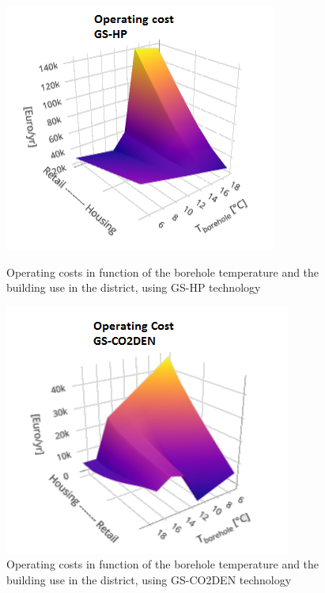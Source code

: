 \documentclass{article}
\begin{document}
\begin{figure}[!htb]
	\centering
	\begin{minipage}{.45\textwidth}
		\centering
		\includegraphics[width=\textwidth]{CUTg_SA_OC.png}
		\caption{Operating costs in function of the borehole temperature and the building use in the district, using GS-HP technology}
		\label{fig:CUTg_OC}
	\end{minipage}%
	\hspace{1cm}
	\begin{minipage}{0.45\textwidth}
		\centering
		\includegraphics[width=\textwidth]{CUTg_SA_CO2_OC.png}
		\caption{Operating costs in function of the borehole temperature and the building use in the district, using GS-CO2DEN technology}
		\label{fig:CUTg_CO2_OC}
	\end{minipage}
\end{figure}
\end{document}
